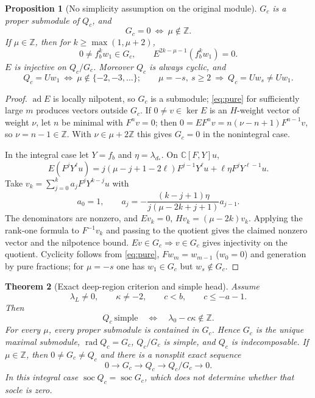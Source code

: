 \documentclass[11pt,a4paper]{article}
\theoremstyle{upright}
\newtheorem{theorem}{Theorem}[section]
\newtheorem{proposition}[theorem]{Proposition}
\newcommand{\C}{\mathbb C}
\newcommand{\Z}{\mathbb Z}
\DeclareMathOperator{\ad}{ad}
\DeclareMathOperator{\soc}{soc}
\DeclareMathOperator{\rad}{rad}
\begin{document}
\begin{proposition}[No simplicity assumption on the original module]\label{prop:G}
$G_c$ is a proper submodule of $Q_c$, and
\[
G_c=0\ \Longleftrightarrow\ \mu\notin\Z.
\]
If $\mu\in\Z$, then for $k\ge\max(1,\mu+2)$,
\[
0\ne f_b^kw_1\in G_c,\qquad E^{2k-\mu-1}(f_b^kw_1)=0.
\]
$E$ is injective on $Q_c/G_c$. Moreover $Q_c$ is always cyclic, and
\[
Q_c=Uw_1\ \Longleftrightarrow\ \mu\notin\{-2,-3,\ldots\};
\qquad \mu=-s,\ s\ge2\ \Longrightarrow\ Q_c=Uw_s\ne Uw_1.
\]
\end{proposition}
\begin{proof}
$\ad E$ is locally nilpotent, so $G_c$ is a submodule; \eqref{eq:pure} for
sufficiently large $m$ produces vectors outside $G_c$. If $0\ne v\in\ker E$
is an $H$-weight vector of weight $\nu$, let $n$ be minimal with $F^nv=0$;
then $0=EF^nv=n(\nu-n+1)F^{n-1}v$, so $\nu=n-1\in\Z$. With
$\nu\in\mu+2\Z$ this gives $G_c=0$ in the nonintegral case.

In the integral case let $Y=f_b$ and $\eta=\lambda_{d_*}$. On $\C[F,Y]u$,
\[
E(F^jY^\ell u)=j(\mu-j+1-2\ell)F^{j-1}Y^\ell u
+\ell\eta F^jY^{\ell-1}u.
\]
Take $v_k=\sum_{j=0}^k a_jF^jY^{k-j}u$ with
\[
a_0=1,\qquad a_j=-\frac{(k-j+1)\eta}{j(\mu-2k+j+1)}a_{j-1}.
\]
The denominators are nonzero, and $Ev_k=0$, $Hv_k=(\mu-2k)v_k$. Applying the
rank-one formula to $F^{-1}v_k$ and passing to the quotient gives the
claimed nonzero vector and the nilpotence bound. $Ev\in G_c\Rightarrow v\in
G_c$ gives injectivity on the quotient. Cyclicity follows from
\eqref{eq:pure}, $Fw_m=w_{m-1}$ ($w_0=0$) and generation by pure fractions;
for $\mu=-s$ one has $w_1\in G_c$ but $w_s\notin G_c$.
\end{proof}

\begin{theorem}[Exact deep-region criterion and simple head]\label{thm:main}
Assume
\begin{equation}\label{eq:main-assumptions}
\lambda_L\ne0,\qquad \kappa\ne-2,\qquad c<b,\qquad c\le-a-1.
\end{equation}
Then
\[
\boxed{\quad Q_c\ \text{simple}\quad\Longleftrightarrow\quad
\lambda_0-c\kappa\notin\Z.\quad}
\]
For every $\mu$, every proper submodule is contained in $G_c$. Hence $G_c$ is
the unique maximal submodule, $\rad Q_c=G_c$, $Q_c/G_c$ is simple, and $Q_c$
is indecomposable. If $\mu\in\Z$, then $0\ne G_c\ne Q_c$ and there is a
nonsplit exact sequence
\begin{equation}\label{eq:head}
0\longrightarrow G_c\longrightarrow Q_c\longrightarrow Q_c/G_c\longrightarrow0.
\end{equation}
In this integral case $\soc Q_c=\soc G_c$, which does not determine whether
that socle is zero.
\end{theorem}
\end{document}
